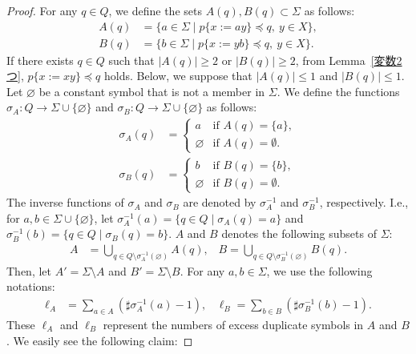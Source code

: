 \begin{proof}
For any $q \in Q$, we define the sets $A(q), B(q) \subset \Sigma$ as follows:
\begin{align*}
  A(q) & = \{ a \in \Sigma \mid p \{ x:=ay \} \preceq q,\ y\in X\},\\ 
  B(q) & = \{ b \in \Sigma \mid p \{ x:=yb \} \preceq q,\ y\in X\}.
  \end{align*}
  If there exists $q\in Q$ such that $|A(q)|\geq 2$ or $|B(q)|\geq 2$, from Lemma~\ref{変数2つ}, $p\{x := xy\} \preceq q$ holds.
Below, we suppose that $|A(q)|\leq 1$ and $|B(q)|\leq 1$.
Let $\varnothing$ be a constant symbol that is not a member in $\Sigma$.
We define the functions $\sigma_{A}: Q \rightarrow \Sigma \cup \{\varnothing\}$ and $\sigma_{B}: Q \rightarrow \Sigma \cup \{\varnothing\}$ as follows:
\begin{align*}
  \sigma_{A}(q) & =
  \begin{cases}
    a & \textrm{if } A(q) = \{a\}, \\
    \varnothing & \textrm{if } A(q) = \emptyset.
  \end{cases}\\
  \sigma_{B}(q) & =
  \begin{cases}
    b & \textrm{if } B(q) = \{b\}, \\
    \varnothing & \textrm{if } B(q) = \emptyset.
  \end{cases}
\end{align*}
The inverse functions of $\sigma_{A}$ and $\sigma_{B}$ are denoted by $\sigma_{A}^{-1}$ and $\sigma_{B}^{-1}$, respectively. I.e., for $a,b \in \Sigma \cup \{\varnothing\}$, let $\sigma_{A}^{-1}(a) = \{q \in Q \mid \sigma_{A}(q) = a\}$ and $\sigma_{B}^{-1}(b) = \{q \in Q \mid \sigma_{B}(q) = b\}$. 
%
$A$ and $B$ denotes the following subsets of $\Sigma$:
\begin{align*}
  A & = \bigcup_{q \in Q \setminus \sigma_{A}^{-1}(\varnothing)} A(q) \mbox{,~~~}
  B = \bigcup_{q \in Q \setminus \sigma_{B}^{-1}(\varnothing)} B(q).
\end{align*}
Then, let $A' = \Sigma \setminus A$ and $B' = \Sigma \setminus B$.
For any $a,b \in \Sigma$, we use the following notations:
\begin{align*}
  \ell_{A} &= \sum_{a \in A}(\sharp \sigma_{A}^{-1}(a) - 1) \mbox{,~~~}
  \ell_{B} = \sum_{b \in B}(\sharp \sigma_{B}^{-1}(b) - 1).
\end{align*}
These $\ell_{A}$ and $\ell_{B}$ represent the numbers of excess duplicate symbols in $A$ and $B$.
We easily see the following claim:  


\end{proof}
